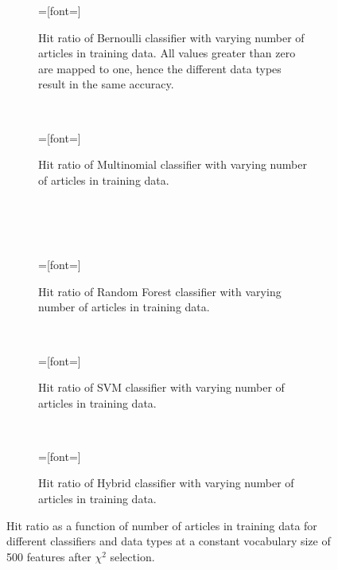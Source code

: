 \setlength{}
\setlength{}
\begin{figure}[H]
	\centering
	\begin{subfigure}[b]{\figwidth}
		=[font=\scriptsize]
		
		\caption{Hit ratio of Bernoulli classifier with varying number of articles in training data. All values greater than zero are mapped to one, hence the different data types result in the same accuracy.}
		\label{fig:hitratio-data-nb}
	\end{subfigure}
	~
	\begin{subfigure}[b]{\figwidth}
		=[font=\scriptsize]
		
		\caption{Hit ratio of Multinomial classifier with varying number of articles in training data.\\\ \\\ }
		\label{fig:hitratio-data-mn}
	\end{subfigure}
	\\
	\begin{subfigure}[b]{\figwidth}
		=[font=\scriptsize]
		
		\caption{Hit ratio of Random Forest classifier with varying number of articles in training data.}
		\label{fig:hitratio-data-rf}
	\end{subfigure}
	~
	\begin{subfigure}[b]{\figwidth}
		=[font=\scriptsize]
		
		\caption{Hit ratio of SVM classifier with varying number of articles in training data.}
		\label{fig:hitratio-data-svm}
	\end{subfigure}
	\\
	\begin{subfigure}[b]{\figwidth}
		=[font=\scriptsize]
		
		\caption{Hit ratio of Hybrid classifier with varying number of articles in training data.}
		\label{fig:hitratio-data-hybrid}
	\end{subfigure}
	\caption{Hit ratio as a function of number of articles in training data for different classifiers and data types at a constant vocabulary size of 500 features after $\chi^2$ selection.}
	\label{fig:hitratio-data}
\end{figure}